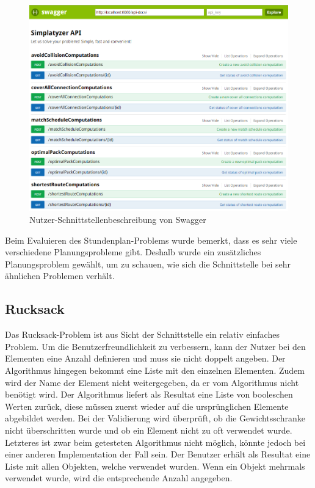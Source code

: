 \begin{figure}[h]
\centering
\includegraphics[scale=0.5]{images/swagger_api.png}
\caption[Nutzer-Schnittstellenbeschreibung von Swagger]{Nutzer-Schnittstellenbeschreibung von Swagger \selfmade{}}
\label{fig:swagger}
\end{figure}

\FloatBarrier

Beim Evaluieren des Stundenplan-Problems wurde bemerkt, dass es sehr viele verschiedene Planungsprobleme gibt. Deshalb wurde ein zusätzliches Planungsproblem gewählt, 
um zu schauen, wie sich die Schnittstelle bei sehr ähnlichen Problemen verhält.

%
%
%
%

\subsection{Rucksack}
Das Rucksack-Problem ist aus Sicht der Schnittstelle ein relativ einfaches Problem. Um die Benutzerfreundlichkeit zu verbessern, kann der Nutzer bei den Elementen eine Anzahl definieren und 
muss sie nicht doppelt angeben. Der Algorithmus hingegen bekommt eine Liste mit den einzelnen Elementen. Zudem wird der Name der Element nicht weitergegeben, da er vom 
Algorithmus nicht benötigt wird. Der Algorithmus liefert als Resultat eine Liste von booleschen Werten zurück, diese müssen zuerst wieder auf die ursprünglichen Elemente abgebildet werden. Bei 
der Validierung wird überprüft, ob die Gewichtsschranke nicht überschritten wurde und ob ein Element nicht zu oft verwendet wurde. Letzteres ist zwar beim getesteten Algorithmus nicht 
möglich, könnte jedoch bei einer anderen Implementation der Fall sein. Der Benutzer erhält als Resultat eine Liste mit allen Objekten, welche verwendet wurden. Wenn ein Objekt mehrmals 
verwendet wurde, wird die entsprechende Anzahl angegeben.

